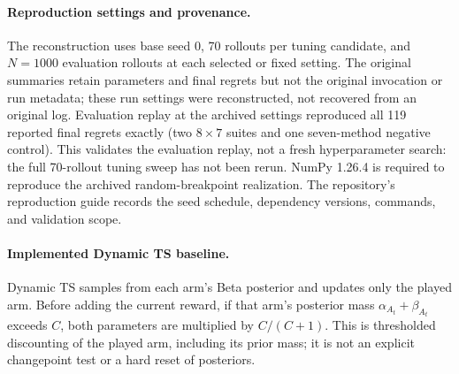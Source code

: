 \documentclass{article}
\begin{document}
\paragraph{Reproduction settings and provenance.}
The reconstruction uses base seed 0, 70 rollouts per tuning candidate, and $N=1000$ evaluation rollouts at each selected or fixed setting. The original summaries retain parameters and final regrets but not the original invocation or run metadata; these run settings were reconstructed, not recovered from an original log. Evaluation replay at the archived settings reproduced all 119 reported final regrets exactly (two $8\times7$ suites and one seven-method negative control). This validates the evaluation replay, not a fresh hyperparameter search: the full 70-rollout tuning sweep has not been rerun. NumPy 1.26.4 is required to reproduce the archived random-breakpoint realization. The repository's reproduction guide records the seed schedule, dependency versions, commands, and validation scope.

\paragraph{Implemented Dynamic TS baseline.}
Dynamic TS samples from each arm's Beta posterior and updates only the played arm. Before adding the current reward, if that arm's posterior mass $\alpha_{A_t}+\beta_{A_t}$ exceeds $C$, both parameters are multiplied by $C/(C+1)$. This is thresholded discounting of the played arm, including its prior mass; it is not an explicit changepoint test or a hard reset of posteriors.
\end{document}
